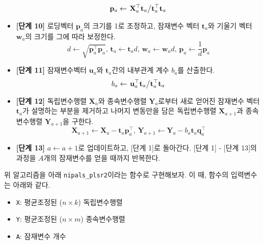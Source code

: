 \documentclass[
]{book}
\providecommand{\tightlist}{%
  \setlength{\itemsep}{0pt}\setlength{\parskip}{0pt}}
\begin{document}
\begin{itemize}
  \[\mathbf{p}_a \leftarrow \left. \mathbf{X}_a^\top \mathbf{t}_a \middle/ \mathbf{t}_a^\top \mathbf{t}_a \right.\]
\item
  \textbf{{[}단계 10{]}} 로딩벡터 \(\mathbf{p}_a\)의 크기를 1로 조정하고, 잠재변수 벡터 \(\mathbf{t}_a\)와 기울기 벡터 \(\mathbf{w}_a\)의 크기를 그에 따라 보정한다.
  \[d \leftarrow \sqrt{\mathbf{p}_a^\top \mathbf{p}_a}, \, \mathbf{t}_a \leftarrow \mathbf{t}_a d, \, \mathbf{w}_a \leftarrow \mathbf{w}_a d, \, \mathbf{p}_a \leftarrow \frac{1}{d} \mathbf{p}_a \]
\item
  \textbf{{[}단계 11{]}} 잠재변수벡터 \(\mathbf{u}_a\)와 \(\mathbf{t}_a\)간의 내부관계 계수 \(b_a\)를 산출한다.
  \[b_a \leftarrow \left. \mathbf{u}_a^\top \mathbf{t}_a \middle/ \mathbf{t}_a^\top \mathbf{t}_a \right. \]
\item
  \textbf{{[}단계 12{]}} 독립변수행렬 \(\mathbf{X}_a\)와 종속변수행렬 \(\mathbf{Y}_a\)로부터 새로 얻어진 잠재변수 벡터 \(\mathbf{t}_a\)가 설명하는 부분을 제거하고 나머지 변동만을 담은 독립변수행렬 \(\mathbf{X}_{a + 1}\)과 종속변수행렬 \(\mathbf{Y}_{a + 1}\)을 구한다.
  \[\mathbf{X}_{a + 1} \leftarrow \mathbf{X}_a - \mathbf{t}_a \mathbf{p}_a^\top, \, \mathbf{Y}_{a + 1} \leftarrow \mathbf{Y}_a - b_a \mathbf{t}_a \mathbf{q}_a^\top \]
\item
  \textbf{{[}단계 13{]}} \(a \leftarrow a + 1\)로 업데이트하고, {[}단계 1{]}로 돌아간다. {[}단계 1{]} - {[}단계 13{]}의 과정을 \(A\)개의 잠재변수를 얻을 때까지 반복한다.
\end{itemize}

위 알고리즘을 아래 \texttt{nipals\_plsr2}이라는 함수로 구현해보자. 이 때, 함수의 입력변수는 아래와 같다.

\begin{itemize}
\tightlist
\item
  \texttt{X}: 평균조정된 (\(n \times k\)) 독립변수행렬
\item
  \texttt{Y}: 평균조정된 (\(n \times m\)) 종속변수행렬
\item
  \texttt{A}: 잠재변수 개수
\end{itemize}
\end{document}
